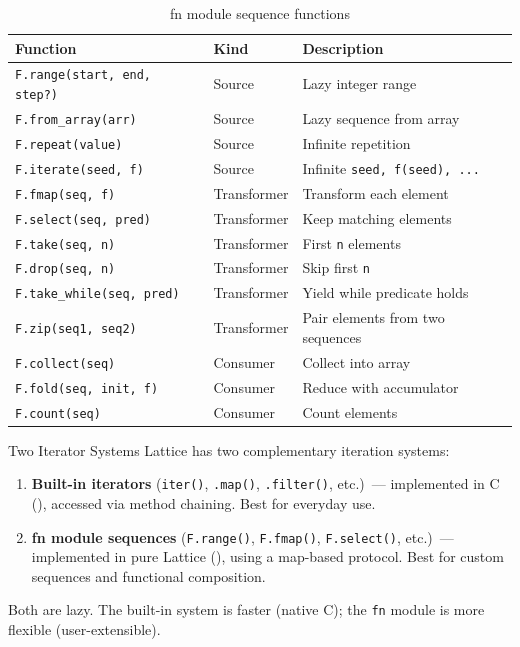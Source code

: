 \begin{table}[htbp]
\centering
\caption{fn module sequence functions}\label{tab:fn-seq-functions}
\begin{tabular}{@{}lll@{}}
\toprule
\textbf{Function} & \textbf{Kind} & \textbf{Description} \\
\midrule
\lstinline|F.range(start, end, step?)| & Source & Lazy integer range \\
\lstinline|F.from_array(arr)| & Source & Lazy sequence from array \\
\lstinline|F.repeat(value)| & Source & Infinite repetition \\
\lstinline|F.iterate(seed, f)| & Source & Infinite \lstinline|seed, f(seed), ...| \\
\lstinline|F.fmap(seq, f)| & Transformer & Transform each element \\
\lstinline|F.select(seq, pred)| & Transformer & Keep matching elements \\
\lstinline|F.take(seq, n)| & Transformer & First \lstinline|n| elements \\
\lstinline|F.drop(seq, n)| & Transformer & Skip first \lstinline|n| \\
\lstinline|F.take_while(seq, pred)| & Transformer & Yield while predicate holds \\
\lstinline|F.zip(seq1, seq2)| & Transformer & Pair elements from two sequences \\
\lstinline|F.collect(seq)| & Consumer & Collect into array \\
\lstinline|F.fold(seq, init, f)| & Consumer & Reduce with accumulator \\
\lstinline|F.count(seq)| & Consumer & Count elements \\
\bottomrule
\end{tabular}
\end{table}

\begin{notebox}{Two Iterator Systems}
Lattice has two complementary iteration systems:
\begin{enumerate}[nosep]
  \item \textbf{Built-in iterators} (\lstinline|iter()|, \lstinline|.map()|, \lstinline|.filter()|, etc.)\ --- implemented in C (), accessed via method chaining. Best for everyday use.
  \item \textbf{fn module sequences} (\lstinline|F.range()|, \lstinline|F.fmap()|, \lstinline|F.select()|, etc.)\ --- implemented in pure Lattice (), using a map-based protocol. Best for custom sequences and functional composition.
\end{enumerate}
Both are lazy. The built-in system is faster (native C); the \lstinline|fn| module is more flexible (user-extensible).
\end{notebox}

